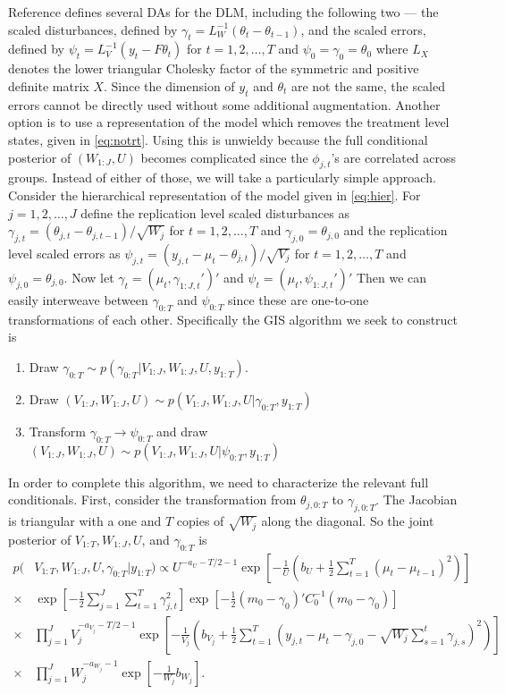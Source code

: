 \documentclass[graybox]{svmult}
\begin{document}
Reference \cite{simpson2014interweaving} defines several DAs for the DLM, including the following two --- the scaled disturbances, defined by $\gamma_t = L_W^{-1}(\theta_t - \theta_{t-1})$, and the scaled errors, defined by $\psi_t = L_V^{-1}(y_t - F\theta_t)$ for $t=1,2,\dots,T$ and $\psi_0=\gamma_0=\theta_0$ where $L_X$ denotes the lower triangular Cholesky factor of the symmetric and positive definite matrix $X$. Since the dimension of $y_t$ and $\theta_t$ are not the same, the scaled errors cannot be directly used without some additional augmentation. Another option is to use a representation of the model which removes the treatment level states, given in \eqref{eq:notrt}. Using this is unwieldy because the full conditional posterior of $(W_{1:J},U)$ becomes complicated since the $\phi_{j,t}$'s are correlated across groups. Instead of either of those, we will take a particularly simple approach. Consider the hierarchical representation of the model given in \eqref{eq:hier}. For $j=1,2,\dots,J$ define the replication level scaled disturbances as $\gamma_{j,t}=(\theta_{j,t} - \theta_{j,t-1})/\sqrt{W_j}$ for $t=1,2,\dots,T$ and $\gamma_{j,0}=\theta_{j,0}$ and the replication level scaled errors as $\psi_{j,t}=(y_{j,t} - \mu_t - \theta_{j,t})/\sqrt{V_j}$ for $t=1,2,\dots,T$ and $\psi_{j,0}=\theta_{j,0}$. Now let $\gamma_t=(\mu_t,\gamma_{1:J,t}')'$ and $\psi_t=(\mu_t,\psi_{1:J,t}')'$ Then we can easily interweave between $\gamma_{0:T}$ and $\psi_{0:T}$ since these are one-to-one transformations of each other. Specifically the GIS algorithm we seek to construct is
\begin{enumerate}
\item Draw $\gamma_{0:T} \sim p(\gamma_{0:T}|V_{1:J},W_{1:J},U,y_{1:T})$.
\item Draw $(V_{1:J},W_{1:J},U) \sim p(V_{1:J},W_{1:J},U|\gamma_{0:T},y_{1:T})$
\item Transform $\gamma_{0:T} \to \psi_{0:T}$ and draw $(V_{1:J},W_{1:J},U) \sim p(V_{1:J},W_{1:J},U|\psi_{0:T},y_{1:T})$
\end{enumerate}
In order to complete this algorithm, we need to characterize the relevant full conditionals. First, consider the transformation from $\theta_{j,0:T}$ to $\gamma_{j,0:T}$. The Jacobian is triangular with a one and $T$ copies of $\sqrt{W_j}$ along the diagonal. So the joint posterior of $V_{1:T},W_{1:J},U$, and $\gamma_{0:T}$ is
\begin{align*}
p(&V_{1:T},W_{1:J},U,\gamma_{0:T}|y_{1:T}) \propto U^{-a_U-T/2-1}\exp\left[-\frac{1}{U}\left(b_U + \frac{1}{2}\sum_{t=1}^T(\mu_t - \mu_{t-1})^2\right)\right]\\
\times& \exp\left[-\frac{1}{2}\sum_{j=1}^J\sum_{t=1}^T\gamma_{j,t}^2\right]\exp\left[-\frac{1}{2}(m_0 - \gamma_0)'C_0^{-1}(m_0 - \gamma_0)\right]\\
\times& \prod_{j=1}^JV_j^{-a_{V_j}-T/2-1}\exp\left[-\frac{1}{V_j}\left(b_{V_j} + \frac{1}{2}\sum_{t=1}^T\left(y_{j,t} - \mu_t - \gamma_{j,0} - \sqrt{W_j}\sum_{s=1}^t\gamma_{j,s}\right)^2\right)\right]\\
\times&\prod_{j=1}^J W_j^{-a_{W_j}-1}\exp\left[-\frac{1}{W_j}b_{W_j}\right].
\end{align*}
\end{document}

